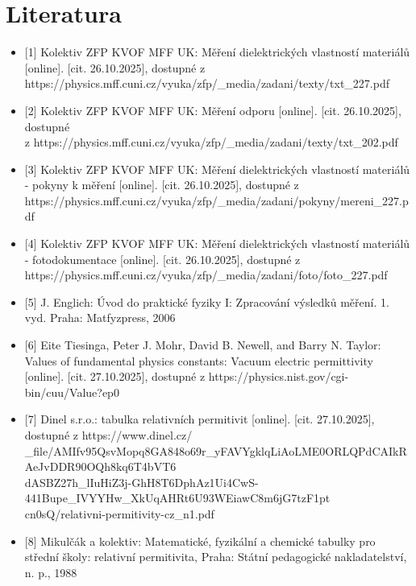 \documentclass{../concepts/prepareprotokol} %
\begin{document}
\section*{Literatura}
\begin{itemize}
\item 

[1] Kolektiv ZFP KVOF MFF UK: Měření dielektrických vlastností materiálů [online]. [cit. 26.10.2025], dostupné z https://physics.mff.cuni.cz/vyuka/zfp/\_media/zadani/texty/txt\_227.pdf

\item 

[2] Kolektiv ZFP KVOF MFF UK: Měření odporu [online]. [cit. 26.10.2025], dostupné \\
z https://physics.mff.cuni.cz/vyuka/zfp/\_media/zadani/texty/txt\_202.pdf

\item

[3] Kolektiv ZFP KVOF MFF UK: Měření dielektrických vlastností materiálů - pokyny k měření [online]. [cit. 26.10.2025], dostupné z https://physics.mff.cuni.cz/vyuka/zfp/\_media/zadani/pokyny/mereni\_227.pdf

\item 

[4] Kolektiv ZFP KVOF MFF UK: Měření dielektrických vlastností materiálů - fotodokumentace [online]. [cit. 26.10.2025], dostupné z https://physics.mff.cuni.cz/vyuka/zfp/\_media/zadani/foto/foto\_227.pdf

\item 

[5] J. Englich: Úvod do praktické fyziky I: Zpracování výsledků měření. 1. vyd. Praha: Matfyzpress, 2006

\item 

[6] Eite Tiesinga, Peter J. Mohr, David B. Newell, and Barry N. Taylor: Values of fundamental physics constants: Vacuum electric permittivity [online]. [cit. 27.10.2025], dostupné z https://physics.nist.gov/cgi-bin/cuu/Value?ep0

\item 

[7] Dinel s.r.o.: tabulka relativních permitivit [online]. [cit. 27.10.2025], dostupné z https://www.dinel.cz/ \\ \_file/AMIfv95QsvMopq8GA848o69r\_yFAVYgklqLiAoLME0ORLQPdCAIkRAeJvDDR90OQh8kq6T4bVT6 \\ 
dASBZ27h\_lIuHiZ3j-GhH8T6DphAz1Ui4CwS-441Bupe\_IVYYHw\_XkUqAHRt6U93WEiawC8m6jG7tzF1pt \\
cn0sQ/relativni-permitivity-cz\_n1.pdf

\item 

[8] Mikulčák a kolektiv: Matematické, fyzikální a chemické tabulky pro střední školy: relativní permitivita, Praha: Státní pedagogické nakladatelství, n. p., 1988

\end{itemize}
\end{document}
